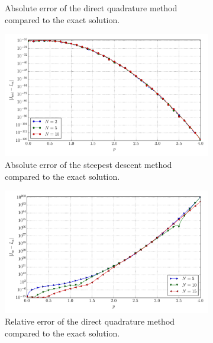 \documentclass[a4paper,10pt]{article}
\begin{document}
\begin{figure}[ht!]
\begin{subfigure}[t]{0.5\linewidth}
    \caption{Absolute error of the direct quadrature method compared to the exact solution.}
    \label{fig:tp_4d_conv_p_1111_1111_err_qr}
  \end{subfigure}
  \begin{subfigure}[t]{0.5\linewidth}
    \includegraphics[width=\linewidth]{./plots/tp_4d_conv_p_(1,1,1,1)_(1,1,1,1)_err_nsd.pdf}
    \caption{Absolute error of the steepest descent method compared to the exact solution.}
    \label{fig:tp_4d_conv_p_1111_1111_err_nsd}
  \end{subfigure}
  \begin{subfigure}[t]{0.5\linewidth}
    \includegraphics[width=\linewidth]{./plots/tp_4d_conv_p_(1,1,1,1)_(1,1,1,1)_err_rel_qr.pdf}
    \caption{Relative error of the direct quadrature method compared to the exact solution.}
    \label{fig:tp_4d_conv_p_1111_1111_err_qr}
  \end{subfigure}
  \begin{subfigure}[t]{0.5\linewidth}

\end{subfigure}
\end{figure}
\end{document}

